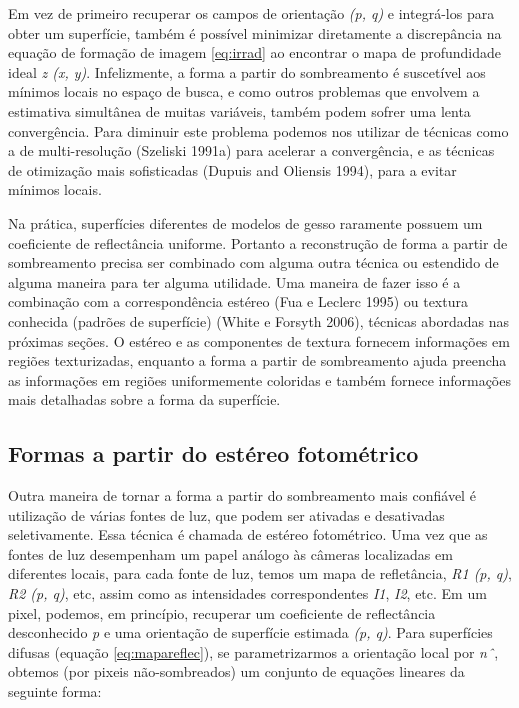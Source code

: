 \documentclass{article}
\begin{document}
Em vez de primeiro recuperar os campos de orientação \textit{(p, q)} e integrá-los para obter um
superfície, também é possível minimizar diretamente a discrepância na equação de formação de imagem
\ref{eq:irrad} ao encontrar o mapa de profundidade ideal \textit{z (x, y)}. Infelizmente, a forma
a partir do sombreamento é suscetível aos mínimos locais no espaço de busca, e como outros
problemas que envolvem a estimativa simultânea de muitas variáveis, também podem sofrer uma lenta convergência. Para diminuir este problema podemos nos utilizar de técnicas como a de multi-resolução (Szeliski 1991a) para acelerar a convergência, e as técnicas de otimização mais sofisticadas (Dupuis and Oliensis 1994), para a evitar mínimos locais.

Na prática, superfícies diferentes de modelos de gesso raramente possuem um coeficiente de reflectância uniforme. Portanto a reconstrução de forma a partir de sombreamento precisa ser combinado com alguma outra técnica ou estendido de alguma maneira para ter alguma utilidade. Uma maneira de fazer isso é a combinação com a correspondência estéreo (Fua e Leclerc 1995) ou textura conhecida (padrões de superfície) (White e Forsyth 2006), técnicas abordadas nas próximas seções. O estéreo e as componentes de textura fornecem informações em regiões texturizadas, enquanto a forma a partir de sombreamento ajuda preencha as informações em regiões uniformemente coloridas e também fornece informações mais detalhadas sobre a forma da superfície.

\subsection{Formas a partir do estéreo fotométrico}


Outra maneira de tornar a forma a partir do sombreamento mais confiável é utilização de várias
fontes de luz, que podem ser ativadas e desativadas seletivamente. Essa técnica é chamada de estéreo fotométrico. Uma vez que as fontes de luz desempenham um papel análogo às câmeras localizadas em diferentes locais, para cada fonte de luz, temos um mapa de refletância, \textit{R1 (p, q)}, \textit{R2 (p, q)}, etc, assim como as intensidades correspondentes \textit{I1}, \textit{I2}, etc. Em um pixel, podemos, em princípio, recuperar um coeficiente de reflectância desconhecido \textit{p} e uma orientação de superfície estimada \textit{(p, q)}. Para superfícies difusas (equação \ref{eq:mapareflec}), se parametrizarmos a orientação local por  \textit{nˆ}, obtemos (por pixeis não-sombreados) um conjunto de equações lineares da seguinte forma:
\end{document}
